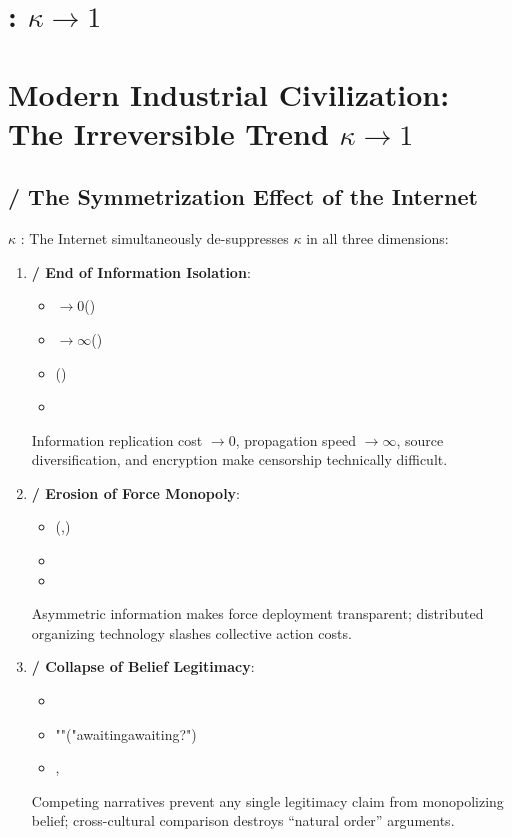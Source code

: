 \documentclass[11pt,a4paper]{article}
\theoremstyle{definition}
\newcommand{\coupling}{\kappa}
\begin{document}
\section{: $\coupling \to 1$}
\section{Modern Industrial Civilization: The Irreversible Trend $\coupling \to 1$}
\subsection{ / The Symmetrization Effect of the Internet}
 $\coupling$ : 
The Internet simultaneously de-suppresses $\coupling$ in all three dimensions:
\begin{enumerate}
 \item \textbf{ / End of Information Isolation}:
 \begin{itemize}
 \item $\to 0$()
 \item $\to \infty$()
 \item ()
 \item 
 \end{itemize}
 Information replication cost $\to 0$, propagation speed $\to \infty$,
 source diversification, and encryption make censorship technically difficult.
 \item \textbf{ / Erosion of Force Monopoly}:
 \begin{itemize}
 \item (,)
 \item 
 \item 
 \end{itemize}
 Asymmetric information makes force deployment transparent;
 distributed organizing technology slashes collective action costs.
 \item \textbf{ / Collapse of Belief Legitimacy}:
 \begin{itemize}
 \item 
 \item ""("awaitingawaiting?")
 \item, 
 \end{itemize}
 Competing narratives prevent any single legitimacy claim from monopolizing belief;
 cross-cultural comparison destroys ``natural order'' arguments.
\end{enumerate}
\end{document}
